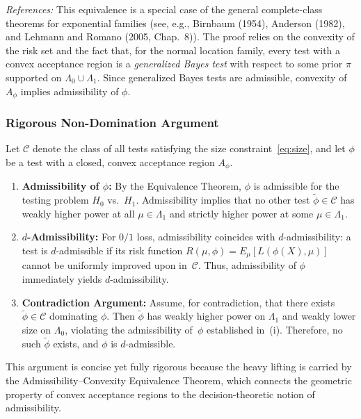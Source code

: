 \documentclass[12pt]{article}
\begin{document}
\noindent
\textit{References:}
This equivalence is a special case of the general complete-class theorems for exponential families (see, e.g.,
Birnbaum (1954), Anderson (1982), and Lehmann and Romano (2005, Chap.~8)).
The proof relies on the convexity of the risk set and the fact that,
for the normal location family, every test with a convex acceptance region is a \emph{generalized Bayes test} with respect to some prior $\pi$ supported on $\Lambda_0\cup\Lambda_1$.
Since generalized Bayes tests are admissible, convexity of $A_\phi$ implies admissibility of $\phi$.

\subsubsection*{Rigorous Non-Domination Argument}

Let $\mathcal{C}$ denote the class of all tests satisfying the size constraint~\eqref{eq:size}, and
let $\phi$ be a test with a closed, convex acceptance region $A_\phi$.

\begin{enumerate}
\item[\textbf{(i)}] \textbf{Admissibility of $\phi$:}
By the Equivalence Theorem, $\phi$ is admissible for the testing problem $H_0$ vs.\ $H_1$.
Admissibility implies that no other test $\tilde\phi\in\mathcal{C}$ has weakly higher power at all $\mu\in\Lambda_1$
and strictly higher power at some $\mu\in\Lambda_1$.

\item[\textbf{(ii)}] \textbf{$d$-Admissibility:}
For $0/1$ loss, admissibility coincides with $d$-admissibility:
a test is $d$-admissible if its risk function $R(\mu,\phi)=E_\mu[L(\phi(X),\mu)]$
cannot be uniformly improved upon in~$\mathcal{C}$.
Thus, admissibility of $\phi$ immediately yields $d$-admissibility.

\item[\textbf{(iii)}] \textbf{Contradiction Argument:}
Assume, for contradiction, that there exists $\tilde\phi\in\mathcal{C}$ dominating $\phi$.
Then $\tilde\phi$ has weakly higher power on $\Lambda_1$ and weakly lower size on $\Lambda_0$,
violating the admissibility of~$\phi$ established in~(i).
Therefore, no such $\tilde\phi$ exists, and $\phi$ is $d$-admissible.
\end{enumerate}

\noindent
This argument is concise yet fully rigorous because the heavy lifting is carried by
the Admissibility–Convexity Equivalence Theorem,
which connects the geometric property of convex acceptance regions
to the decision-theoretic notion of admissibility.
\end{document}
